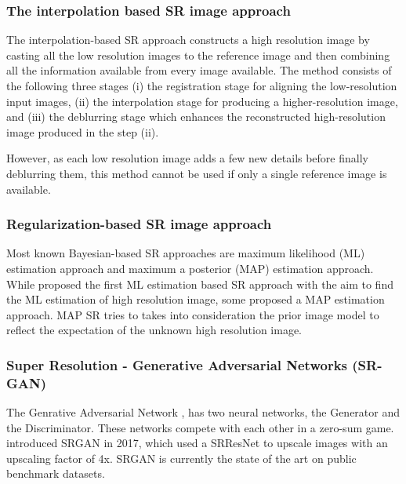 \documentclass{article} %
\begin{document}
\subsubsection{The interpolation based SR image approach}
\hspace*{0.25 in} The interpolation-based SR approach constructs a high resolution image by casting all the low resolution images to the reference image and then combining all the information available from every image available.
    The method consists of the following three stages
    (i) the registration stage for aligning the low-resolution input images,
    (ii) the interpolation stage for producing a higher-resolution image, and
    (iii) the deblurring stage which enhances the
    reconstructed high-resolution image produced in the step (ii).
    
    However, as each low resolution image adds a few new details before finally deblurring them, this method cannot be used if only a single reference image is available.\\
    
\subsubsection{Regularization-based SR image approach}
\hspace*{0.25 in} Most known Bayesian-based SR approaches are maximum likelihood (ML) estimation approach  and maximum a posterior (MAP) estimation approach.\\
    \hspace*{0.25 in}  While \cite{Brian1996ML} proposed the first ML estimation based SR approach with the aim to find the ML estimation of high resolution image, some proposed a MAP estimation approach. MAP SR tries to takes into consideration the prior image model to reflect the expectation of the unknown high resolution image.\\
    
\subsubsection{Super Resolution - Generative Adversarial Networks (SR-GAN)}
\hspace*{0.25 in} The Genrative Adversarial Network \citep{goodfellow2014generative}, has two neural networks, the Generator and the Discriminator. These networks compete with each other in a zero-sum game.
    \cite{ledig2017photorealistic} introduced SRGAN in 2017, which used a SRResNet to upscale images with an upscaling factor of 4x. SRGAN is currently the state of the art on public benchmark datasets.
    
\end{document}
